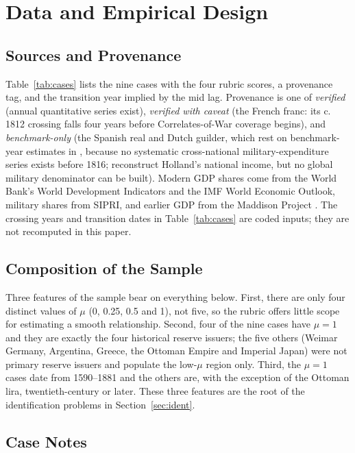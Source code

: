 \documentclass[11pt,letterpaper]{article}
\theoremstyle{definition}
\theoremstyle{plain}
\begin{document}
\section{Data and Empirical Design}\label{sec:data}

\subsection{Sources and Provenance}
Table~\ref{tab:cases} lists the nine cases with the four rubric scores, a provenance tag, and the transition year implied by the mid lag. Provenance is one of \emph{verified} (annual quantitative series exist), \emph{verified with caveat} (the French franc: its c.\,1812 crossing falls four years before Correlates-of-War coverage begins), and \emph{benchmark-only} (the Spanish real and Dutch guilder, which rest on benchmark-year estimates in \citealt{kennedy1987}, because no systematic cross-national military-expenditure series exists before 1816; \citealt{vanzanden2012} reconstruct Holland's national income, but no global military denominator can be built). Modern GDP shares come from the World Bank's World Development Indicators and the IMF World Economic Outlook, military shares from SIPRI, and earlier GDP from the Maddison Project \citep{bolt2020}. The crossing years and transition dates in Table~\ref{tab:cases} are coded inputs; they are not recomputed in this paper.

\subsection{Composition of the Sample}
Three features of the sample bear on everything below. First, there are only four distinct values of $\mu$ (0, 0.25, 0.5 and 1), not five, so the rubric offers little scope for estimating a smooth relationship. Second, four of the nine cases have $\mu=1$ and they are exactly the four historical reserve issuers; the five others (Weimar Germany, Argentina, Greece, the Ottoman Empire and Imperial Japan) were not primary reserve issuers and populate the low-$\mu$ region only. Third, the $\mu=1$ cases date from 1590--1881 and the others are, with the exception of the Ottoman lira, twentieth-century or later. These three features are the root of the identification problems in Section~\ref{sec:ident}.

\subsection{Case Notes}
\end{document}
